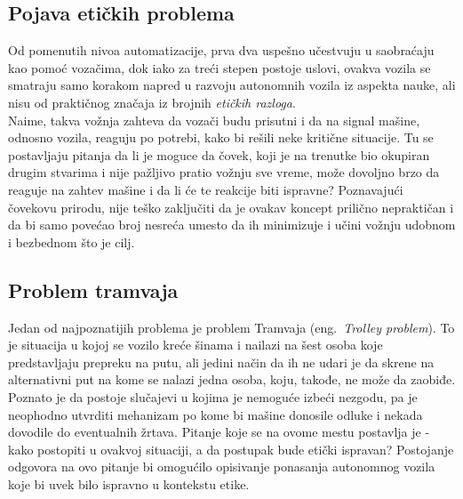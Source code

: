 \documentclass[a4paper]{article}
\begin{document}
\subsection{Pojava etičkih problema}
\label{subsec:Pojava etičkih problema}
Od pomenutih nivoa automatizacije, prva dva uspešno učestvuju u saobraćaju kao pomoć vozačima, dok iako za treći stepen postoje uslovi, ovakva vozila se smatraju samo korakom napred u razvoju autonomnih vozila iz aspekta nauke, ali nisu od praktičnog značaja iz brojnih \emph{etičkih razloga}. \cite{eticki_problemi_vozila} \\
Naime, takva vožnja zahteva da vozači budu prisutni i da na signal mašine, odnosno vozila, reaguju po potrebi, kako bi rešili neke kritične situacije. Tu se postavljaju pitanja da li je moguce da čovek, koji je na trenutke bio okupiran drugim stvarima i nije pažljivo pratio vožnju sve vreme, može dovoljno brzo da reaguje na zahtev mašine i da li će te reakcije biti ispravne? Poznavajući čovekovu prirodu, nije teško zaključiti da je ovakav koncept prilično nepraktičan i da bi samo povećao broj nesreća umesto da ih minimizuje i učini vožnju udobnom i bezbednom što je cilj.

\subsection{Problem tramvaja}
\label{subsec:Pojava etičkih problema}
Jedan od najpoznatijih problema je problem Tramvaja (eng.~{\em Trolley problem}). To je situacija u kojoj se vozilo kreće šinama i nailazi na šest osoba koje predstavljaju prepreku na putu, ali jedini način da ih ne udari je da skrene na alternativni put na kome se nalazi jedna osoba, koju, takođe, ne može da zaobiđe.  \\
Poznato je da postoje slučajevi u kojima je nemoguće izbeći nezgodu, pa je neophodno utvrditi mehanizam po kome bi mašine donosile odluke i nekada dovodile do eventualnih žrtava. Pitanje koje se na ovome mestu postavlja je - kako postopiti u ovakvoj situaciji, a da postupak bude etički ispravan? Postojanje odgovora na ovo pitanje bi omogućilo opisivanje ponasanja autonomnog vozila koje bi uvek bilo ispravno u kontekstu etike.
\end{document}

